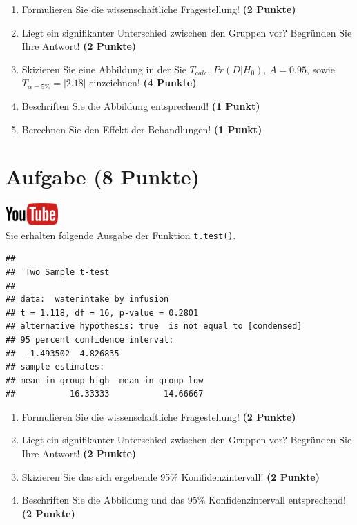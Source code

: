 \documentclass[a4paper, 9pt]{scrartcl}\usepackage[]{graphicx}\usepackage[]{xcolor}
\makeatletter
\newenvironment{kframe}{%
 \def\at@end@of@kframe{}%
 \ifinner\ifhmode%
  \def\at@end@of@kframe{\end{minipage}}%
  \begin{minipage}{\columnwidth}%
 \fi\fi%
 \def\FrameCommand##1{\hskip\@totalleftmargin \hskip-\fboxsep
 \colorbox{shadecolor}{##1}\hskip-\fboxsep
     \hskip-\linewidth \hskip-\@totalleftmargin \hskip\columnwidth}%
 \MakeFramed {\advance\hsize-\width
   \@totalleftmargin\z@ \linewidth\hsize
   \@setminipage}}%
 {\par\unskip\endMakeFramed%
 \at@end@of@kframe}
\newenvironment{knitrout}{}{} %
\makeatother
\begin{document}
\begin{enumerate}
  \item Formulieren Sie die wissenschaftliche Fragestellung! \textbf{(2
Punkte)}
\item Liegt ein signifikanter Unterschied zwischen den Gruppen vor?
  Begr{\"u}nden Sie Ihre Antwort! \textbf{(2 Punkte)}
\item Skizieren Sie eine Abbildung in der Sie $T_{calc}$, $Pr(D|H_0)$, $A=0.95$,
  sowie $T_{\alpha=5\%} = |2.18|$ einzeichnen! \textbf{(4 Punkte)}
\item Beschriften Sie die Abbildung entsprechend! \textbf{(1 Punkt)}  
\item Berechnen Sie den Effekt der Behandlungen! \textbf{(1 Punkt)}
\end{enumerate} 
\clearpage

\section{Aufgabe \hfill (8 Punkte)}

\hfill\href{https://youtu.be/wJqsNV1hOW8}{\includegraphics[width =
  2cm]{img/youtube}}\\[1Ex]

Sie erhalten folgende \Rlogo Ausgabe der Funktion \texttt{t.test()}.

\begin{knitrout}
\color{fgcolor}\begin{kframe}
\begin{verbatim}
## 
## 	Two Sample t-test
## 
## data:  waterintake by infusion
## t = 1.118, df = 16, p-value = 0.2801
## alternative hypothesis: true  is not equal to [condensed]
## 95 percent confidence interval:
##  -1.493502  4.826835
## sample estimates:
## mean in group high  mean in group low 
##           16.33333           14.66667
\end{verbatim}
\end{kframe}
\end{knitrout}


\begin{enumerate}
  \item Formulieren Sie die wissenschaftliche Fragestellung! \textbf{(2
Punkte)}
\item Liegt ein signifikanter Unterschied zwischen den Gruppen vor?
  Begr{\"u}nden Sie Ihre Antwort! \textbf{(2 Punkte)}
\item Skizieren Sie das sich ergebende 95\% Konifidenzintervall! \textbf{(2 Punkte)}
\item Beschriften Sie die Abbildung und
  das 95\% Konfidenzintervall entsprechend! \textbf{(2 Punkte)}  
\end{enumerate} 
\clearpage
\end{document}
